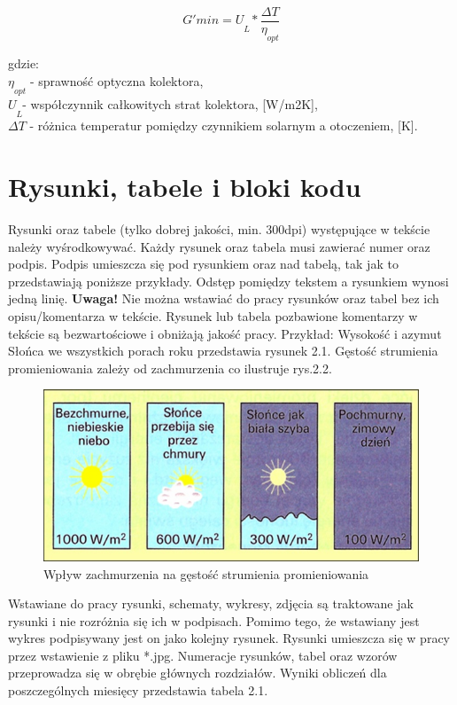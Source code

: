 \documentclass[11pt]{extreport}
\begin{document}
\begin{equation}
  G'min = U\underset{L}{}*\frac{\Delta T}{\eta\underset{opt}{} } \tag{3.1}\label{eq:3.1} 
\end{equation}

gdzie: \\
$\eta\underset{opt}{}$ - sprawność optyczna kolektora, \\
$U\underset{L}{}$- współczynnik całkowitych strat kolektora, [W/m2K],\\
$\Delta T$ - różnica temperatur pomiędzy czynnikiem solarnym a otoczeniem, [K].\\

\section{Rysunki, tabele i bloki kodu}

Rysunki oraz tabele (tylko dobrej jakości, min. 300dpi) występujące w tekście należy wyśrodkowywać. Każdy rysunek oraz tabela musi zawierać numer oraz podpis. Podpis umieszcza się pod rysunkiem oraz nad tabelą, tak jak to przedstawiają poniższe przykłady. Odstęp pomiędzy tekstem a rysunkiem wynosi jedną linię. \textbf{Uwaga!} Nie można wstawiać do pracy rysunków oraz tabel bez ich opisu/komentarza w tekście. Rysunek lub tabela pozbawione komentarzy w tekście są bezwartościowe i obniżają jakość pracy. 
Przykład: Wysokość i azymut Słońca we wszystkich porach roku przedstawia rysunek 2.1. Gęstość strumienia promieniowania zależy od zachmurzenia co ilustruje rys.2.2. \\

\begin{figure}[ht]
    \centering
    \includegraphics[width=0.75\linewidth]{images/Obraz3.png}
    \caption{Wpływ zachmurzenia na gęstość strumienia promieniowania }
    \label{fig:Obraz3}
\end{figure}

Wstawiane do pracy rysunki, schematy, wykresy, zdjęcia są traktowane jak rysunki i nie rozróżnia się ich w podpisach. Pomimo tego, że wstawiany jest wykres podpisywany jest on jako kolejny rysunek. Rysunki umieszcza się w pracy przez wstawienie z pliku *.jpg.
Numeracje rysunków, tabel oraz wzorów przeprowadza się w obrębie głównych rozdziałów. Wyniki obliczeń dla poszczególnych miesięcy przedstawia tabela 2.1.
\end{document}
